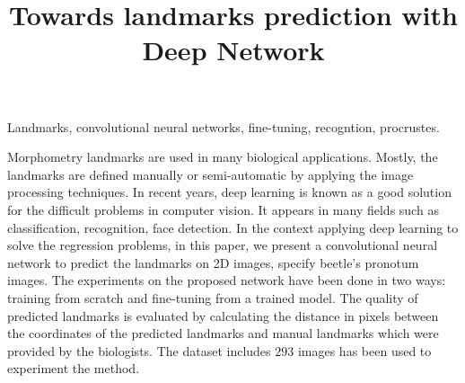 \documentclass[10pt]{article}
\begin{document}
\noindent



\title{Towards landmarks prediction with Deep Network}




\maketitle

\keywords
Landmarks, convolutional neural networks, fine-tuning, recogntion, procrustes.

\abstract
Morphometry landmarks are used in many biological applications. Mostly, the landmarks are defined manually or semi-automatic by applying the image processing techniques. In recent years, deep learning is known as a good solution for the difficult problems in computer vision. It appears in many fields such as classification, recognition, face detection. In the context applying deep learning to solve the regression problems, in this paper, we present a convolutional neural network to predict the landmarks on 2D images, specify beetle's pronotum images. The experiments on the proposed network have been done in two ways: training from scratch and fine-tuning from a trained model. The quality of predicted landmarks is evaluated by calculating the distance in pixels between the coordinates of the predicted landmarks and manual landmarks which were provided by the biologists. The dataset includes $293$ images has been used to experiment the method.
\end{document}
